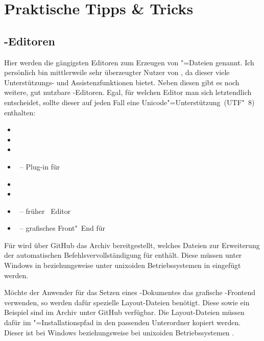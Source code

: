 \newcommand*\TaT{\hyperref[sec:tips]{Tipps \& Tricks}}
\chapter{Praktische Tipps \& Tricks}
%
\section{-Editoren}
\label{sec:tips:editor}
Hier werden die gängigsten Editoren zum Erzeugen von "=Dateien 
genannt. Ich persönlich bin mittlerweile sehr überzeugter Nutzer von 
, da dieser viele Unterstützungs- und 
Assistenzfunktionen bietet. Neben diesen gibt es noch weitere, gut nutzbare 
-Editoren. Egal, für welchen Editor man sich letztendlich 
entscheidet, sollte dieser auf jeden Fall eine Unicode"=Unterstützung~(UTF"~8) 
enthalten:
%
\begin{itemize}
\item {}
\item {}
\item {}
\item {}~-- Plug-in für 
\item {}
\item {}
\item {}~-- früher ~Editor
\item {}~-- grafisches Front"~End für 
\end{itemize}
%
Für  wird über GitHub das Archiv 
%
{} bereitgestellt, welches Dateien zur Erweiterung 
der automatischen Befehlsvervollständigung für \TUDScript enthält. Diese müssen 
unter Windows in  beziehungsweise 
unter unixoiden Betriebssystemen in  eingefügt werden.

Möchte der Anwender für das Setzen eines \TUDScript-Dokumentes das grafische 
-Frontend  verwenden, so werden dafür 
spezielle Layout-Dateien benötigt. Diese sowie ein Beispiel sind im Archiv 
%
{} unter GitHub verfügbar. Die Layout-Dateien müssen 
dafür im "=Installationspfad in den passenden 
Unterordner kopiert werden. Dieser ist bei Windows
beziehungsweise bei unixoiden Betriebssystemen .



